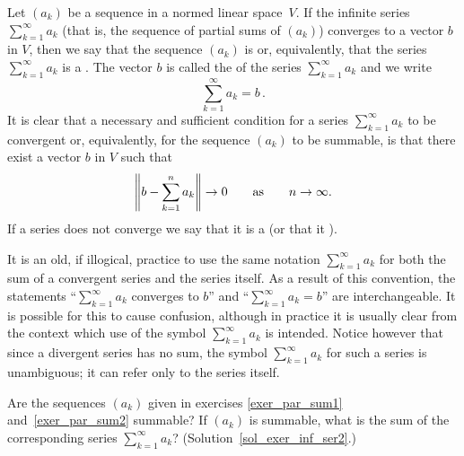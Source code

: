 \begin{defn}  Let $(a_k)$ be a sequence in a normed linear space~$V$.  If the infinite series
$\sum_{k=1}^\infty a_k$ (that is, the sequence of partial sums of $(a_k)$) converges to a
vector $b$ in $V$, then we say that the sequence $(a_k)$ is
 or, equivalently, that the series $\sum_{k=1}^\infty a_k$ is a
.  The vector $b$ is called the
 of the series $\sum_{k=1}^\infty a_k$ and we write
  \[ \sum_{k=1}^\infty a_k = b\,. \]
It is clear that a necessary and sufficient condition for a series $\sum_{k=1}^\infty a_k$ to
be convergent or, equivalently, for the sequence $(a_k)$ to be summable, is that there exist a
vector $b$ in $V$ such that
  \begin{equation}\label{cond_ser_conv}
     \left\lVert b - \sum_{k=1}^n a_k\right\rVert \rightarrow 0 \qquad \text{as} \qquad n \rightarrow \infty.
  \end{equation}
If a series does not converge we say that it is a
 (or that it ).
\end{defn}

\begin{cau}  It is an old, if illogical, practice to use the same notation $\sum_{k=1}^\infty a_k$
for both the sum of a convergent series and the series itself.  As a result of this
convention, the statements ``$\sum_{k=1}^\infty a_k$ converges to $b$'' and
``$\sum_{k=1}^\infty a_k = b$'' are interchangeable.  It is possible for this to cause
confusion, although in practice it is usually clear from the context which use of the symbol
$\sum_{k=1}^\infty a_k$ is intended.  Notice however that since a divergent series has no sum,
the symbol $\sum_{k=1}^\infty a_k$ for such a series is unambiguous; it can refer only to the
series itself.
\end{cau}

\begin{exer}\label{exer_inf_ser2}  Are the sequences $(a_k)$ given in exercises
\ref{exer_par_sum1} and~\ref{exer_par_sum2} summable? If $(a_k)$ is summable, what is the sum
of the corresponding series $\sum_{k=1}^\infty a_k$?  (Solution~\ref{sol_exer_inf_ser2}.)
\end{exer}

